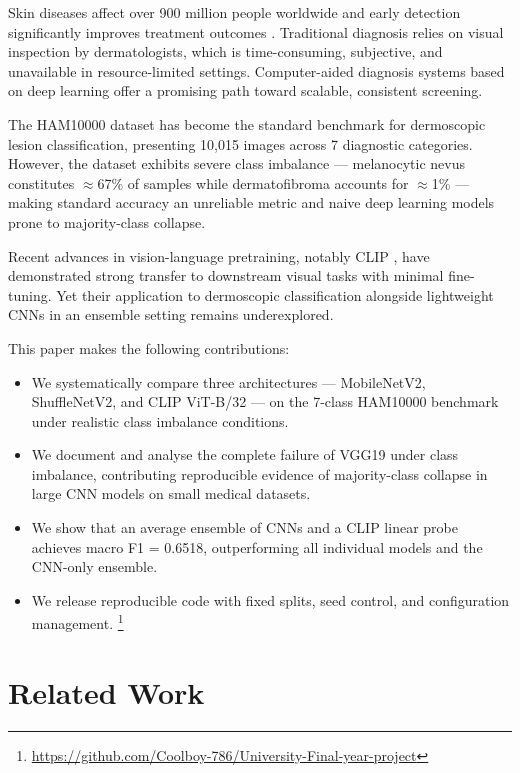 \documentclass[conference]{IEEEtran}
\begin{document}
Skin diseases affect over 900 million people worldwide and early
detection significantly improves treatment outcomes \cite{who_skin}.
Traditional diagnosis relies on visual inspection by dermatologists,
which is time-consuming, subjective, and unavailable in
resource-limited settings. Computer-aided diagnosis systems based on
deep learning offer a promising path toward scalable, consistent
screening.

The HAM10000 dataset \cite{tschandl2018} has become the standard
benchmark for dermoscopic lesion classification, presenting 10,015
images across 7 diagnostic categories. However, the dataset exhibits
severe class imbalance --- melanocytic nevus constitutes $\approx$67\%
of samples while dermatofibroma accounts for $\approx$1\% --- making
standard accuracy an unreliable metric and naive deep learning models
prone to majority-class collapse.

Recent advances in vision-language pretraining, notably CLIP
\cite{radford2021}, have demonstrated strong transfer to downstream
visual tasks with minimal fine-tuning. Yet their application to
dermoscopic classification alongside lightweight CNNs in an ensemble
setting remains underexplored.

This paper makes the following contributions:
\begin{itemize}
    \item We systematically compare three architectures ---
          MobileNetV2, ShuffleNetV2, and CLIP ViT-B/32 --- on the
          7-class HAM10000 benchmark under realistic class imbalance
          conditions.
    \item We document and analyse the complete failure of VGG19 under
          class imbalance, contributing reproducible evidence of
          majority-class collapse in large CNN models on small medical
          datasets.
    \item We show that an average ensemble of CNNs and a CLIP linear
          probe achieves macro F1 = 0.6518, outperforming all
          individual models and the CNN-only ensemble.
    \item We release reproducible code with fixed splits, seed
          control, and configuration management.%
          \footnote{\url{https://github.com/Coolboy-786/University-Final-year-project}}
\end{itemize}

\section{Related Work}
\end{document}
